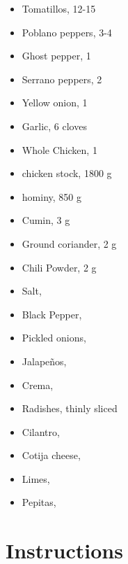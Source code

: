 \documentclass[
  letterpaper,
  DIV=11,
  numbers=noendperiod,
  titlepage=false]{scrreprt}
\providecommand{\tightlist}{%
  \setlength{\itemsep}{0pt}\setlength{\parskip}{0pt}}\usepackage{longtable,booktabs,array}
\begin{document}
\begin{itemize}
\tightlist
\item
  Tomatillos, 12-15
\item
  Poblano peppers, 3-4
\item
  Ghost pepper, 1
\item
  Serrano peppers, 2
\item
  Yellow onion, 1
\item
  Garlic, 6 cloves
\item
  Whole Chicken, 1
\item
  chicken stock, 1800 g
\item
  hominy, 850 g
\item
  Cumin, 3 g
\item
  Ground coriander, 2 g
\item
  Chili Powder, 2 g
\item
  Salt,
\item
  Black Pepper,
\item
  Pickled onions,
\item
  Jalapeños,
\item
  Crema,
\item
  Radishes, thinly sliced
\item
  Cilantro,
\item
  Cotija cheese,
\item
  Limes,
\item
  Pepitas,
\end{itemize}

\section{Instructions}\label{instructions}
\end{document}
